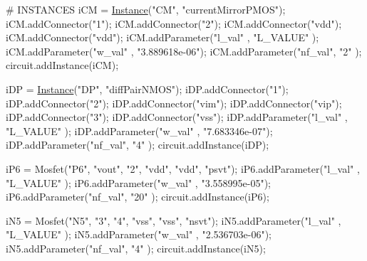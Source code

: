 \begin{DoxyCodeInclude}
\textcolor{comment}{# INSTANCES}
iCM = \mbox{\hyperlink{class_instance}{Instance}}(\textcolor{stringliteral}{"CM"}, \textcolor{stringliteral}{"currentMirrorPMOS"});
iCM.addConnector(\textcolor{stringliteral}{"1"});
iCM.addConnector(\textcolor{stringliteral}{"2"});
iCM.addConnector(\textcolor{stringliteral}{"vdd"});
iCM.addConnector(\textcolor{stringliteral}{"vdd"});
iCM.addParameter(\textcolor{stringliteral}{"l\_val"} , \textcolor{stringliteral}{"L\_VALUE"}     );
iCM.addParameter(\textcolor{stringliteral}{"w\_val"} , \textcolor{stringliteral}{"3.889618e-06"});
iCM.addParameter(\textcolor{stringliteral}{"nf\_val"}, \textcolor{stringliteral}{"2"}           );
circuit.addInstance(iCM);

iDP = \mbox{\hyperlink{class_instance}{Instance}}(\textcolor{stringliteral}{"DP"}, \textcolor{stringliteral}{"diffPairNMOS"});
iDP.addConnector(\textcolor{stringliteral}{"1"});
iDP.addConnector(\textcolor{stringliteral}{"2"});
iDP.addConnector(\textcolor{stringliteral}{"vim"});
iDP.addConnector(\textcolor{stringliteral}{"vip"});
iDP.addConnector(\textcolor{stringliteral}{"3"});
iDP.addConnector(\textcolor{stringliteral}{"vss"});
iDP.addParameter(\textcolor{stringliteral}{"l\_val"} , \textcolor{stringliteral}{"L\_VALUE"}     );
iDP.addParameter(\textcolor{stringliteral}{"w\_val"} , \textcolor{stringliteral}{"7.683346e-07"});
iDP.addParameter(\textcolor{stringliteral}{"nf\_val"}, \textcolor{stringliteral}{"4"}           );
circuit.addInstance(iDP);

iP6 = Mosfet(\textcolor{stringliteral}{"P6"}, \textcolor{stringliteral}{"vout"}, \textcolor{stringliteral}{"2"}, \textcolor{stringliteral}{"vdd"}, \textcolor{stringliteral}{"vdd"}, \textcolor{stringliteral}{"psvt"});
iP6.addParameter(\textcolor{stringliteral}{"l\_val"} , \textcolor{stringliteral}{"L\_VALUE"}     );
iP6.addParameter(\textcolor{stringliteral}{"w\_val"} , \textcolor{stringliteral}{"3.558995e-05"});
iP6.addParameter(\textcolor{stringliteral}{"nf\_val"}, \textcolor{stringliteral}{"20"}          );
circuit.addInstance(iP6);

iN5 = Mosfet(\textcolor{stringliteral}{"N5"}, \textcolor{stringliteral}{"3"}, \textcolor{stringliteral}{"4"}, \textcolor{stringliteral}{"vss"}, \textcolor{stringliteral}{"vss"}, \textcolor{stringliteral}{"nsvt"});
iN5.addParameter(\textcolor{stringliteral}{"l\_val"} , \textcolor{stringliteral}{"L\_VALUE"}     );
iN5.addParameter(\textcolor{stringliteral}{"w\_val"} , \textcolor{stringliteral}{"2.536703e-06"});
iN5.addParameter(\textcolor{stringliteral}{"nf\_val"}, \textcolor{stringliteral}{"4"}           );
circuit.addInstance(iN5);


\end{DoxyCodeInclude}
